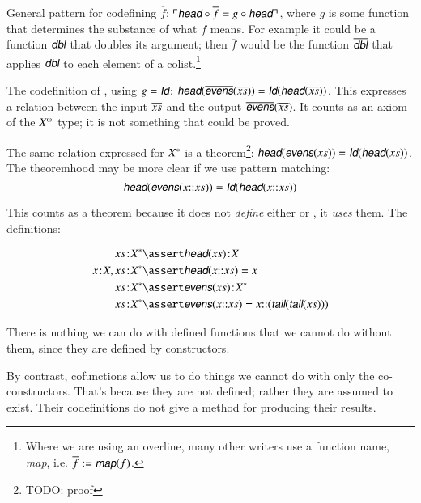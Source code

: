 \documentclass{article}
\begin{document}
\vspace{2ex}

General pattern for codefining \(\overline{f}\): \(\ulcorner
\cohead\circ\overline{f} = g\circ\cohead\urcorner\), where \(g\) is
some function that determines the substance of what \(\overline{f}\)
means. For example it could be a function \(\textsf{\slshape dbl}\)
that doubles its argument; then \(\overline{f}\) would be the function
\(\codefn{dbl}\) that applies \(\defn{dbl}\) to each element of a
colist.\footnote{Where we are using an overline, many other writers
use a function name, \textsf{\slshape map}, i.e. \(\overline{f} :=
\textsf{\slshape map}(f)\).}

\vspace{1ex}

The codefinition of , using \(g = \idfun\):
\(\cohead(\codefn{evens}(\coseq{x})) = \idfun(\cohead(\coseq{x}))\).
This expresses a relation between the input \(\overline{xs}\) and the
output \(\codefn{evens}(\coseq{x})\). It counts as an axiom of the
\(\colist{X}\) type; it is not something that could be proved.

The same relation expressed for \({X^{*}}\) is a theorem\footnote{TODO: proof}:
\(\head(\defn{evens}(\seq{x})) = \idfun(\head(\seq{x}))\). The theoremhood may be more clear if we use pattern matching:
\[\head(\defn{evens}(x\cons\seq{x})) = \idfun(\head(x\cons\seq{x}))\]

This counts as a theorem because it does not \textit{define} either
\head{} or , it \textit{uses} them. The definitions:

\begin{align}
 \tj{\seq{x}}{\List{X}} & \linfer \tj{\head(\seq{x})}{X} \\
 \tj{x}{X},\tj{\seq{x}}{\List{X}} & \linfer \head(x\cons\seq{x}) = x \\
 \tj{\seq{x}}{\List{X}} & \linfer \tj{\defn{evens}(\seq{x})}{\List{X}} \\
 \tj{\seq{x}}{\List{X}} & \linfer \defn{evens}(x\cons\seq{x})
   = x\cons(\tail(\tail(\seq{x})))
\end{align}

There is nothing we can do with defined functions that we cannot do
without them, since they are defined by constructors.

By contrast, cofunctions allow us to do things we cannot do with only
the co-constructors. That's because they are not defined; rather they
are assumed to exist. Their codefinitions do not give a method for
producing their results.
\end{document}
